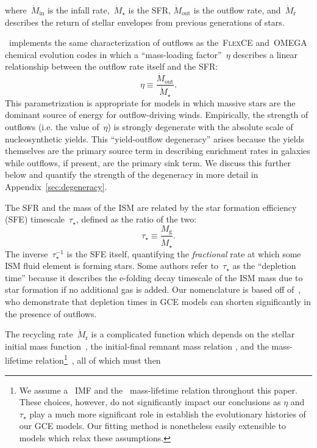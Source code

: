 \documentclass[ms.tex]{subfiles}
\begin{document}
where~$\dot{M}_\text{in}$ is the infall rate,~$\dot{M}_\star$ is the SFR,
$\dot{M}_\text{out}$ is the outflow rate, and~$\dot{M}_\text{r}$ describes
the return of stellar envelopes from previous generations of stars.
\par
\vice~implements the same characterization of outflows as the~\textsc{FlexCE}
\citep{Andrews2017} and~\textsc{OMEGA}~\citep{Cote2017} chemical evolution
codes in which a ``mass-loading factor''~$\eta$ describes a linear relationship
between the outflow rate itself and the SFR:
\begin{equation}
\eta \equiv \frac{\dot{M}_\text{out}}{\dot{M}_\star}.
\end{equation}
This parametrization is appropriate for models in which massive stars are the
dominant source of energy for outflow-driving winds.
Empirically, the strength of outflows (i.e. the value of~$\eta$) is strongly
degenerate with the absolute scale of nucleosynthetic yields.
This ``yield-outflow degeneracy'' arises because the yields themselves are the
primary source term in describing enrichment rates in galaxies while outflows,
if present, are the primary sink term.
We discuss this further below and quantify the strength of the degeneracy in
more detail in Appendix~\ref{sec:degeneracy}.
\par
The SFR and the mass of the ISM are related by the star formation efficiency
(SFE) timescale~$\tau_\star$, defined as the ratio of the two:
\begin{equation}
\tau_\star \equiv \frac{M_\text{g}}{\dot{M}_\star}.
\end{equation}
The inverse~$\tau_\star^{-1}$ is the SFE itself, quantifying the
\textit{fractional} rate at which some ISM fluid element is forming stars.
Some authors refer to~$\tau_\star$ as the ``depletion time''
\citep[e.g.][]{Tacconi2018} because it describes the e-folding decay timescale
of the ISM mass due to star formation if no additional gas is added.
Our nomenclature is based off of~\citet{Weinberg2017}, who demonstrate that
depletion times in GCE models can shorten significantly in the presence of
outflows.
\par
The recycling rate~$\dot{M}_\text{r}$ is a complicated function which depends
on the stellar initial mass function~\citep[IMF; e.g.][]{Salpeter1955,
Miller1979, Kroupa2001, Chabrier2003}, the initial-final remnant mass relation
\citep[e.g.][]{Kalirai2008}, and the mass-lifetime relation\footnote{
	We assume a~\citet{Kroupa2001} IMF and the~\citet{Larson1974} mass-lifetime
	relation throughout this paper.
	These choices, however, do not significantly impact our conclusions as
	$\eta$ and~$\tau_\star$ play a much more significant role in establish the
	evolutionary histories of our GCE models.
	Our fitting method is nonetheless easily extensible to models which relax
	these assumptions.
}~\citep*[e.g.][]{Larson1974, Maeder1989, Hurley2000}, all of which must then
\end{document}
